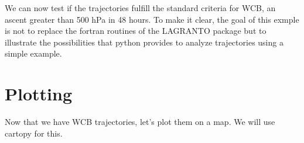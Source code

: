 \documentclass[a4paper,10pt,english]{sphinxmanual}
\begin{document}
\begin{sphinxVerbatim}[commandchars=\\\{\}]
   
  
  \PYG{p}{[}\PYG{p}{]}\PYG{p}{[}\PYG{p}{]}
  
\end{sphinxVerbatim}

We can now test if the trajectories fulfill the standard criteria for WCB, an ascent greater than 500 hPa in 48 hours.
To make it clear, the goal of this exmple is not to replace the fortran routines of the LAGRANTO package but to illustrate the possibilities that python provides to analyze trajectories using a simple example.

\begin{sphinxVerbatim}[commandchars=\\\{\}]
  \PYG{p}{[}\PYG{p}{]}\PYG{p}{[} \PYG{p}{]}  \PYG{p}{[}\PYG{p}{]}  
  
\PYG{p}{[}\PYG{p}{[}\PYG{p}{]} \PYG{p}{]}
\end{sphinxVerbatim}


\section{Plotting}
\label{\detokenize{tutorial_lagranto:plotting}}
Now that we have WCB trajectories, let’s plot them on a map. We will use cartopy for this.
\end{document}
